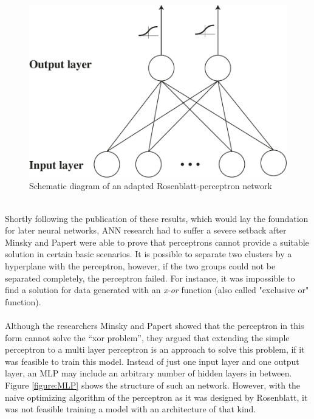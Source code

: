 \documentclass[11pt,a4paper]{article}
\begin{document}
\begin{figure}[h]
	\centering
	\includegraphics[scale=0.5]{adaption_perceptron.pdf}
	\caption{Schematic diagram of an adapted Rosenblatt-perceptron network}
	\label{adaption_perceptron}
\end{figure}
\ \\
Shortly following the publication of these results, which would lay the foundation for later neural networks, ANN research had to suffer a severe setback after Minsky and Papert \cite{Minsky1969} were able to prove that perceptrons cannot provide a suitable solution in certain basic scenarios. It is possible to separate two clusters by a hyperplane with the perceptron, however, if the two groups could not be separated completely, the perceptron failed. For instance, it was impossible to find a solution for data generated with an \textit{x-or} function (also called "exclusive or" function).\\
\ \\
Although the researchers Minsky and Papert showed that the perceptron in this form cannot solve the “xor problem”, they argued that extending the simple perceptron to a multi layer perceptron is an approach to solve this problem, if it was feasible to train this model. Instead of just one input layer and one output layer, an MLP may include an arbitrary number of hidden layers in between. Figure \ref{figure:MLP} shows the structure of such an network. However, with the naive optimizing algorithm of the perceptron as it was designed by Rosenblatt, it was not feasible training a model with an architecture of that kind.\\
\end{document}
